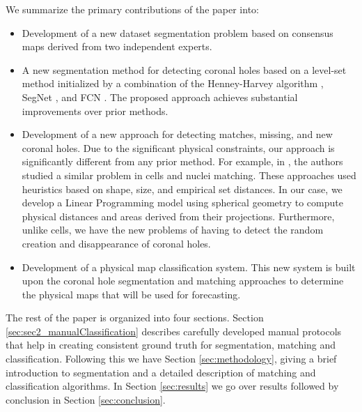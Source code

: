 \documentclass[journal]{IEEEtran}
\begin{document}
We summarize the primary contributions of the paper into:
\begin{itemize}
  \item Development of a new dataset segmentation problem based
              on consensus maps derived from two independent experts.              

 \item {\color{blue} A new segmentation method for detecting coronal holes based on
 	a level-set method initialized 
 	by a combination of the Henney-Harvey algorithm \cite{Henney2005}, SegNet \cite{SegNet},
 	and FCN \cite{long2015fully,shelhamer2016fully}.
 	The proposed approach achieves substantial improvements over
 	    prior methods.}
 \item Development of a new approach for detecting matches, missing,
            and new coronal holes.       
          Due to the significant physical constraints, our approach
            is significantly different from any prior method.
          For example, in  \cite{Chen2006, Li2010, Dewan2011}, the authors
           studied a similar problem in cells and nuclei matching.
         These approaches used heuristics based on shape, size, and
            empirical set distances.
         In our case, we develop a Linear Programming model using
            spherical geometry to compute
            physical distances and areas derived from their projections.
       Furthermore, unlike cells, we have the new problems of having
            to detect the random creation and disappearance of coronal holes.
   \item Development of a physical map classification system.
       This new system is built upon the coronal hole segmentation and matching
            approaches to determine the physical maps that will be used for forecasting.         
\end{itemize}

The rest of the paper is organized into four sections. Section \ref{sec:sec2_manualClassification}
describes carefully developed manual protocols that help in creating consistent ground truth for
segmentation, matching and classification. Following this we have Section \ref{sec:methodology},
giving a brief introduction to segmentation and a detailed description of matching and classification
algorithms. In Section \ref{sec:results} we go over results followed by conclusion in Section \ref{sec:conclusion}.
\end{document}
